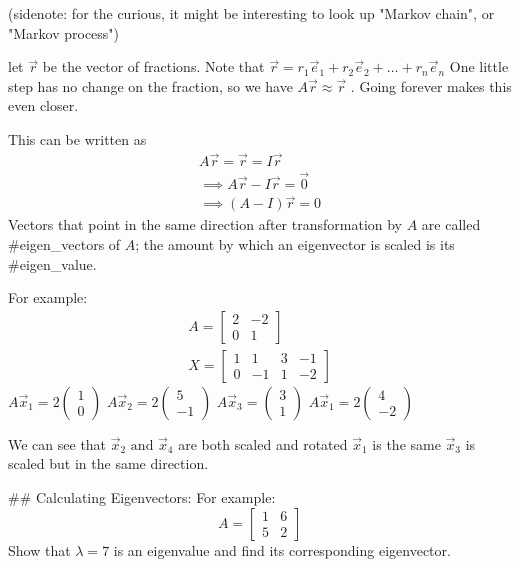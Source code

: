 (sidenote: for the curious, it might be interesting to look up "Markov chain", or "Markov process")

let $\vec{r}$ be the vector of fractions. Note that $\vec{r}=r_{1}\vec{e}_{1}+r_{2}\vec{e}_{2}+\dots+r_{n}\vec{e}_{n}$
One little step has no change on the fraction, so we have $A\vec{r}\approx \vec{r}$ . Going forever makes this even closer.

This can be written as
$$
\begin{align}
A\vec{r}=\vec{r}=I\vec{r} \\
\implies A\vec{r}-I\vec{r}=\vec{0} \\

\implies (A-I)\vec{r}=0
\end{align}
$$
Vectors that point in the same direction after transformation by $A$ are called #eigen_vectors of $A$; the amount by which an eigenvector is scaled is its #eigen_value.

For example: 
$$
\begin{align}
A=\begin{bmatrix}
2 & -2 \\
0 & 1
\end{bmatrix}\\
X = \begin{bmatrix}
1 & 1 & 3 & -1 \\
0 & -1 & 1 & -2
\end{bmatrix}
\end{align}
$$
$A\vec{x}_{1}=2\begin{pmatrix}1\\0\end{pmatrix}$
$A\vec{x}_{2}=2\begin{pmatrix}5\\-1\end{pmatrix}$
$A\vec{x}_{3}=\begin{pmatrix}3\\1\end{pmatrix}$
$A\vec{x}_{1}=2\begin{pmatrix}4\\-2\end{pmatrix}$

We can see that $\vec{x}_{2} \text{ and } \vec{x}_{4}$ are both scaled and rotated
$\vec{x}_{1}$ is the same
$\vec{x}_{3}$ is scaled but in the same direction.

## Calculating Eigenvectors:
For example: 
$$
A=\begin{bmatrix}
1 & 6 \\
5 & 2
\end{bmatrix}
$$
Show that $\lambda=7$ is an eigenvalue and find its corresponding eigenvector.

